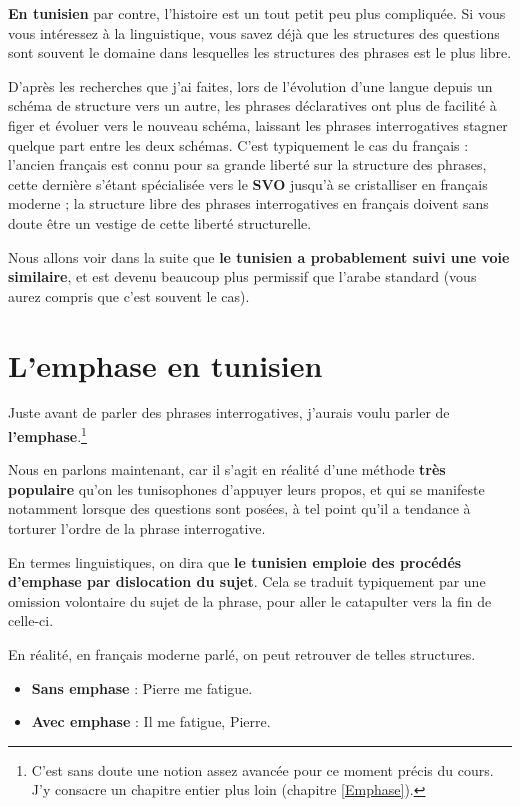\textbf{En tunisien} par contre, l'histoire est un tout petit peu plus compliquée. Si vous vous intéressez à la linguistique, vous savez déjà que les structures des questions sont souvent le domaine dans lesquelles les structures des phrases est le plus libre. 

D'après les recherches que j'ai faites, lors de l'évolution d'une langue depuis un schéma de structure vers un autre, les phrases déclaratives ont plus de facilité à figer et évoluer vers le nouveau schéma, laissant les phrases interrogatives stagner quelque part entre les deux schémas. C'est typiquement le cas du français : l'ancien français est connu pour sa grande liberté sur la structure des phrases, cette dernière s'étant spécialisée vers le \textbf{SVO} jusqu'à se cristalliser en français moderne ; la structure libre des phrases interrogatives en français doivent sans doute être un vestige de cette liberté structurelle.

Nous allons voir dans la suite que \textbf{le tunisien a probablement suivi une voie similaire}, et est devenu beaucoup plus permissif que l'arabe standard (vous aurez compris que c'est souvent le cas).

\section{L'emphase en tunisien}
Juste avant de parler des phrases interrogatives, j'aurais voulu parler de \textbf{l'emphase}.\footnote{C'est sans doute une notion assez avancée pour ce moment précis du cours. J'y consacre un chapitre entier plus loin (chapitre \ref{Emphase}).} 

Nous en parlons maintenant, car il s'agit en réalité d'une méthode \textbf{très populaire} qu'on les tunisophones d'appuyer leurs propos, et qui se manifeste notamment lorsque des questions sont posées, à tel point qu'il a tendance à torturer l'ordre de la phrase interrogative. 

En termes linguistiques, on dira que \textbf{le tunisien emploie des procédés d'emphase par dislocation du sujet}. Cela se traduit typiquement par une omission volontaire du sujet de la phrase, pour aller le catapulter vers la fin de celle-ci.

En réalité, en français moderne parlé, on peut retrouver de telles structures. 

\begin{itemize}
    \item \textbf{Sans emphase} : Pierre me fatigue.
    \item \textbf{Avec emphase} : Il me fatigue, Pierre.
\end{itemize}

